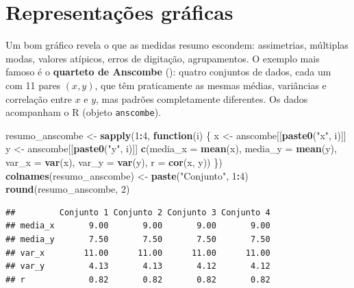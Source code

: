 \documentclass[
]{book}
\newenvironment{Shaded}{\begin{snugshade}}{\end{snugshade}}
\newcommand{\AttributeTok}[1]{\textcolor[rgb]{0.13,0.29,0.53}{#1}}
\newcommand{\ControlFlowTok}[1]{\textcolor[rgb]{0.13,0.29,0.53}{\textbf{#1}}}
\newcommand{\DecValTok}[1]{\textcolor[rgb]{0.00,0.00,0.81}{#1}}
\newcommand{\FunctionTok}[1]{\textcolor[rgb]{0.13,0.29,0.53}{\textbf{#1}}}
\newcommand{\NormalTok}[1]{#1}
\newcommand{\OtherTok}[1]{\textcolor[rgb]{0.56,0.35,0.01}{#1}}
\newcommand{\SpecialCharTok}[1]{\textcolor[rgb]{0.81,0.36,0.00}{\textbf{#1}}}
\newcommand{\StringTok}[1]{\textcolor[rgb]{0.31,0.60,0.02}{#1}}
\begin{document}
\section{Representações gráficas}\label{representauxe7uxf5es-gruxe1ficas}

Um bom gráfico revela o que as medidas resumo escondem: assimetrias, múltiplas modas, valores atípicos, erros de digitação, agrupamentos. O exemplo mais famoso é o \textbf{quarteto de Anscombe} (): quatro conjuntos de dados, cada um com 11 pares \((x, y)\), que têm praticamente as mesmas médias, variâncias e correlação entre \(x\) e \(y\), mas padrões completamente diferentes. Os dados acompanham o R (objeto \texttt{anscombe}).

\begin{Shaded}
\begin{Highlighting}[]
\NormalTok{resumo\_anscombe }\OtherTok{\textless{}{-}} \FunctionTok{sapply}\NormalTok{(}\DecValTok{1}\SpecialCharTok{:}\DecValTok{4}\NormalTok{, }\ControlFlowTok{function}\NormalTok{(i) \{}
\NormalTok{  x }\OtherTok{\textless{}{-}}\NormalTok{ anscombe[[}\FunctionTok{paste0}\NormalTok{(}\StringTok{"x"}\NormalTok{, i)]]}
\NormalTok{  y }\OtherTok{\textless{}{-}}\NormalTok{ anscombe[[}\FunctionTok{paste0}\NormalTok{(}\StringTok{"y"}\NormalTok{, i)]]}
  \FunctionTok{c}\NormalTok{(}\AttributeTok{media\_x =} \FunctionTok{mean}\NormalTok{(x), }\AttributeTok{media\_y =} \FunctionTok{mean}\NormalTok{(y), }\AttributeTok{var\_x =} \FunctionTok{var}\NormalTok{(x), }\AttributeTok{var\_y =} \FunctionTok{var}\NormalTok{(y), }\AttributeTok{r =} \FunctionTok{cor}\NormalTok{(x, y))}
\NormalTok{\})}
\FunctionTok{colnames}\NormalTok{(resumo\_anscombe) }\OtherTok{\textless{}{-}} \FunctionTok{paste}\NormalTok{(}\StringTok{"Conjunto"}\NormalTok{, }\DecValTok{1}\SpecialCharTok{:}\DecValTok{4}\NormalTok{)}
\FunctionTok{round}\NormalTok{(resumo\_anscombe, }\DecValTok{2}\NormalTok{)}
\end{Highlighting}
\end{Shaded}

\begin{verbatim}
##         Conjunto 1 Conjunto 2 Conjunto 3 Conjunto 4
## media_x       9.00       9.00       9.00       9.00
## media_y       7.50       7.50       7.50       7.50
## var_x        11.00      11.00      11.00      11.00
## var_y         4.13       4.13       4.12       4.12
## r             0.82       0.82       0.82       0.82
\end{verbatim}
\end{document}
